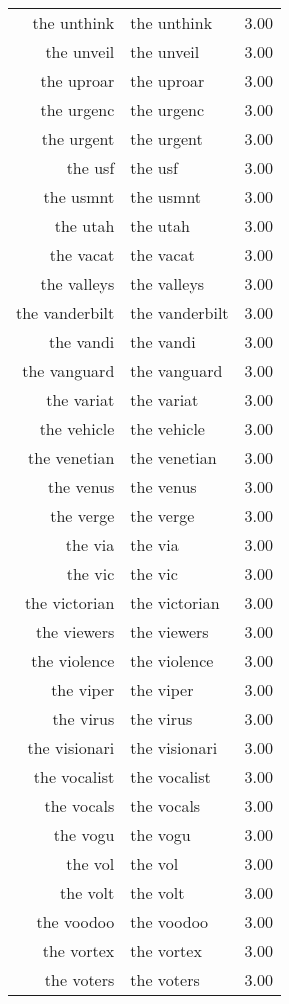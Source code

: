 \begin{table}[ht]
\begin{tabular}{rlr}
  the unthink & the unthink & 3.00 \\ 
  the unveil & the unveil & 3.00 \\ 
  the uproar & the uproar & 3.00 \\ 
  the urgenc & the urgenc & 3.00 \\ 
  the urgent & the urgent & 3.00 \\ 
  the usf & the usf & 3.00 \\ 
  the usmnt & the usmnt & 3.00 \\ 
  the utah & the utah & 3.00 \\ 
  the vacat & the vacat & 3.00 \\ 
  the valleys & the valleys & 3.00 \\ 
  the vanderbilt & the vanderbilt & 3.00 \\ 
  the vandi & the vandi & 3.00 \\ 
  the vanguard & the vanguard & 3.00 \\ 
  the variat & the variat & 3.00 \\ 
  the vehicle & the vehicle & 3.00 \\ 
  the venetian & the venetian & 3.00 \\ 
  the venus & the venus & 3.00 \\ 
  the verge & the verge & 3.00 \\ 
  the via & the via & 3.00 \\ 
  the vic & the vic & 3.00 \\ 
  the victorian & the victorian & 3.00 \\ 
  the viewers & the viewers & 3.00 \\ 
  the violence & the violence & 3.00 \\ 
  the viper & the viper & 3.00 \\ 
  the virus & the virus & 3.00 \\ 
  the visionari & the visionari & 3.00 \\ 
  the vocalist & the vocalist & 3.00 \\ 
  the vocals & the vocals & 3.00 \\ 
  the vogu & the vogu & 3.00 \\ 
  the vol & the vol & 3.00 \\ 
  the volt & the volt & 3.00 \\ 
  the voodoo & the voodoo & 3.00 \\ 
  the vortex & the vortex & 3.00 \\ 
  the voters & the voters & 3.00 \\ 

\end{tabular}
\end{table}

